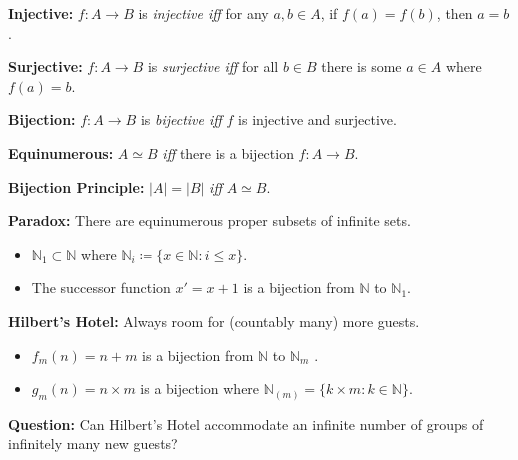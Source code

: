 \documentclass[handout]{beamer}
\newcommand{\set}[1]{\lbrace#1\rbrace} %
\newcommand{\abs}[1]{|#1|} %
\newcommand{\N}{\mathbb{N}}
\begin{document}
  

\begin{frame}

  \textbf{Injective:} $f: A\to B$ is \textit{injective iff} for any $a,b\in A$, if $f(a)=f(b)$, then $a=b$. 
  \vspace{.2in}

  \textbf{Surjective:} $f: A\to B$ is \textit{surjective iff} for all $b\in B$ there is some $a\in A$ where $f(a)=b$.
  \vspace{.2in}

  \textbf{Bijection:} $f: A\to B$ is \textit{bijective iff} $f$ is injective and surjective. 
  \vspace{.2in}

  \textbf{Equinumerous:} $A\simeq B$ \textit{iff} there is a bijection $f: A \to B$.
  \vspace{.2in}

  \textbf{Bijection Principle:} $\abs{A}=\abs{B}$ \textit{iff} $A\simeq B$.

\end{frame}


\begin{frame}

  \textbf{Paradox:} There are equinumerous proper subsets of infinite sets.

  \begin{itemize}
    \item $\N_1 \subset \N$ where $\N_i\coloneq\set{x \in \N : i \leq x}$.
    \item The successor function $x'= x + 1$ is a bijection from $\N$ to $\N_1$. 
  \end{itemize}
  \vspace{.2in}
  \pause


  \textbf{Hilbert's Hotel:} Always room for (countably many) more guests.

  \begin{itemize}
    \item $f_m(n) = n + m$ is a bijection from $\N$ to $\N_m$ .
    \item $g_m(n) = n \times m$ is a bijection where $\N_{(m)}=\set{k\times m: k \in \N}$.
  \end{itemize}
  \vspace{.2in}
  \pause

  \textbf{Question:} Can Hilbert's Hotel accommodate an infinite number of groups of infinitely many new guests?

\end{frame}
\end{document}
